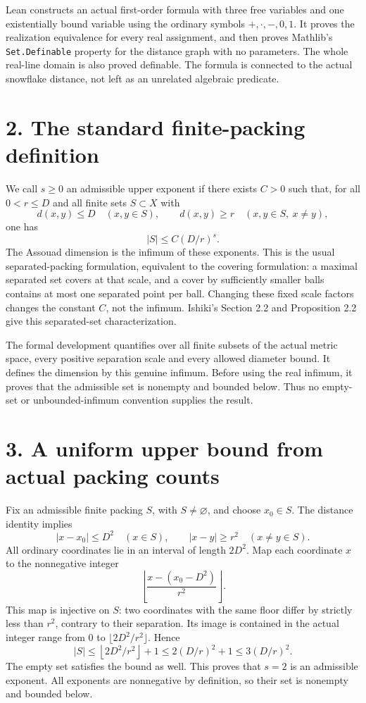 \documentclass[10pt]{article}
\begin{document}
Lean constructs an actual first-order formula with three free variables and one existentially bound variable using the ordinary symbols $+,\cdot,-,0,1$. It proves the realization equivalence for every real assignment, and then proves Mathlib's \texttt{Set.Definable} property for the distance graph with no parameters. The whole real-line domain is also proved definable. The formula is connected to the actual snowflake distance, not left as an unrelated algebraic predicate.

\section*{2. The standard finite-packing definition}
We call $s\ge0$ an admissible upper exponent if there exists $C>0$ such that, for all $0<r\le D$ and all finite sets $S\subset X$ with
\[
d(x,y)\le D\quad(x,y\in S),\qquad
d(x,y)\ge r\quad(x,y\in S,\ x\ne y),
\]
one has
\[
|S|\le C(D/r)^s.
\]
The Assouad dimension is the infimum of these exponents. This is the usual separated-packing formulation, equivalent to the covering formulation: a maximal separated set covers at that scale, and a cover by sufficiently smaller balls contains at most one separated point per ball. Changing these fixed scale factors changes the constant $C$, not the infimum. Ishiki's Section 2.2 and Proposition 2.2 give this separated-set characterization.

The formal development quantifies over all finite subsets of the actual metric space, every positive separation scale and every allowed diameter bound. It defines the dimension by this genuine infimum. Before using the real infimum, it proves that the admissible set is nonempty and bounded below. Thus no empty-set or unbounded-infimum convention supplies the result.

\section*{3. A uniform upper bound from actual packing counts}
Fix an admissible finite packing $S$, with $S\ne\varnothing$, and choose $x_0\in S$. The distance identity implies
\[
|x-x_0|\le D^2\quad(x\in S),\qquad
|x-y|\ge r^2\quad(x\ne y\in S).
\]
All ordinary coordinates lie in an interval of length $2D^2$. Map each coordinate $x$ to the nonnegative integer
\[
\left\lfloor\frac{x-(x_0-D^2)}{r^2}\right\rfloor.
\]
This map is injective on $S$: two coordinates with the same floor differ by strictly less than $r^2$, contrary to their separation. Its image is contained in the actual integer range from $0$ to $\lfloor 2D^2/r^2\rfloor$. Hence
\[
|S|\le \left\lfloor 2D^2/r^2\right\rfloor+1
\le 2(D/r)^2+1\le3(D/r)^2.
\]
The empty set satisfies the bound as well. This proves that $s=2$ is an admissible exponent. All exponents are nonnegative by definition, so their set is nonempty and bounded below.
\end{document}
